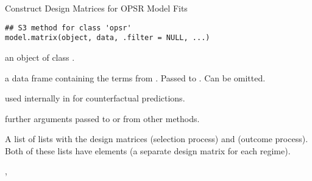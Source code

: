 %
\begin{Description}
Construct Design Matrices for OPSR Model Fits
\end{Description}
%
\begin{Usage}
\begin{verbatim}
## S3 method for class 'opsr'
model.matrix(object, data, .filter = NULL, ...)
\end{verbatim}
\end{Usage}
%
\begin{Arguments}
\begin{ldescription}
\item[\code{object}] an object of class .

\item[\code{data}] a data frame containing the terms from . Passed to
. Can be omitted.

\item[\code{.filter}] used internally in  for counterfactual predictions.

\item[\code{...}] further arguments passed to or from other methods.
\end{ldescription}
\end{Arguments}
%
\begin{Value}
A list of lists with the design matrices  (selection process) and
 (outcome process). Both of these lists have  elements (a
separate design matrix for each regime).
\end{Value}
%
\begin{SeeAlso}
, 
\end{SeeAlso}


